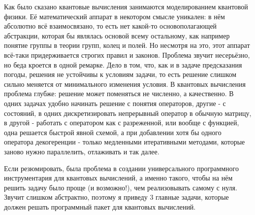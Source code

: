 \documentclass[aps,twocolumn,pra,showpacs,amsmath,amssymb,showkeys,10pt]{revtex4-2}
\begin{document}
         Как было сказано квантовые вычисления занимаются моделированием квантовой физики. Её математический аппарат в некотором смысле уникален: в нём абсолютно всё взаимосвязано, то есть нет какой-то
         основополагающей абстракции, которая бы являлась основой всему остальному, как например понятие группы в теории групп, колец и полей. Но несмотря на это, этот аппарат всё-таки придерживается
          строгих правил и законов. Проблема звучит несерьёзно, но беда кроется в одной ремарке. Дело 
          в том, что, как и в задаче предсказания погоды, решения не устойчивы к условиям задачи, то есть решение слишком сильно меняется от минимального изменения условия. В квантовых вычисления проблема 
          глубже: решение может поменяться не численно, а качественно. В одних задачах удобно начинать решение с понятия операторов, другие - с состояний, 
          в одних дискретизировать непрерывный оператор в обычную матрицу, в другой - работать с оператором как с разреженной, или вообще с функцией, одна решается быстрой явной схемой, 
          а при добавлении хотя бы одного оператора декогеренции - только медленными итеративными методами, которые заново нужно параллелить, отлаживать и так далее.

          Если резюмировать, была проблема в создании универсального программного инструментария для квантовых вычислений, а именно такого, чтобы на нём решить задачу было проще (и возможно!), 
          чем реализовывать самому с нуля. Звучит слишком абстрактно, поэтому я приведу 3 главные задачи, которые должен решать программный пакет для квантовых вычислений.
\end{document}
